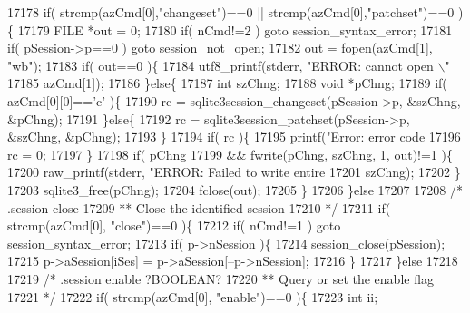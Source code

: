 \begin{DoxyCode}
{{{{{{{{{{{{{{{{{{{{{{{{{{{{{{{{{{{{{{{{{{{{{{{{{{{{{{{{{{{{{{{{{{{{{{{{{{{{{{{{{{{{17178     \textcolor{keywordflow}{if}( strcmp(azCmd[0],\textcolor{stringliteral}{"changeset"})==0 || strcmp(azCmd[0],\textcolor{stringliteral}{"patchset"})==0 )\{
17179       FILE *out = 0;
17180       \textcolor{keywordflow}{if}( nCmd!=2 ) \textcolor{keywordflow}{goto} session\_syntax\_error;
17181       \textcolor{keywordflow}{if}( pSession->p==0 ) \textcolor{keywordflow}{goto} session\_not\_open;
17182       out = fopen(azCmd[1], \textcolor{stringliteral}{"wb"});
17183       \textcolor{keywordflow}{if}( out==0 )\{
17184         utf8_printf(stderr, \textcolor{stringliteral}{"ERROR: cannot open \(\backslash\)"%
17185                     azCmd[1]);
17186       \}\textcolor{keywordflow}{else}\{
17187         \textcolor{keywordtype}{int} szChng;
17188         \textcolor{keywordtype}{void} *pChng;
17189         \textcolor{keywordflow}{if}( azCmd[0][0]==\textcolor{charliteral}{'c'} )\{
17190           rc = sqlite3session\_changeset(pSession->p, &szChng, &pChng);
17191         \}\textcolor{keywordflow}{else}\{
17192           rc = sqlite3session\_patchset(pSession->p, &szChng, &pChng);
17193         \}
17194         \textcolor{keywordflow}{if}( rc )\{
17195           printf(\textcolor{stringliteral}{"Error: error code %
17196           rc = 0;
17197         \}
17198         \textcolor{keywordflow}{if}( pChng
17199           && fwrite(pChng, szChng, 1, out)!=1 )\{
17200           raw_printf(stderr, \textcolor{stringliteral}{"ERROR: Failed to write entire %
17201                   szChng);
17202         \}
17203         sqlite3_free(pChng);
17204         fclose(out);
17205       \}
17206     \}\textcolor{keywordflow}{else}
17207 
17208     \textcolor{comment}{/* .session close}
17209 \textcolor{comment}{    ** Close the identified session}
17210 \textcolor{comment}{    */}
17211     \textcolor{keywordflow}{if}( strcmp(azCmd[0], \textcolor{stringliteral}{"close"})==0 )\{
17212       \textcolor{keywordflow}{if}( nCmd!=1 ) \textcolor{keywordflow}{goto} session\_syntax\_error;
17213       \textcolor{keywordflow}{if}( p->nSession )\{
17214         session\_close(pSession);
17215         p->aSession[iSes] = p->aSession[--p->nSession];
17216       \}
17217     \}\textcolor{keywordflow}{else}
17218 
17219     \textcolor{comment}{/* .session enable ?BOOLEAN?}
17220 \textcolor{comment}{    ** Query or set the enable flag}
17221 \textcolor{comment}{    */}
17222     \textcolor{keywordflow}{if}( strcmp(azCmd[0], \textcolor{stringliteral}{"enable"})==0 )\{
17223       \textcolor{keywordtype}{int} ii;
}}}}}}}}}}}}}}}}}}}}}}}}}}}}}}}}}}}}}}}}}}}}}}}}}}}}}}}}}}}}}}}}}}}}}}}}}}}}}}}}}}}}}}}
\end{DoxyCode}
